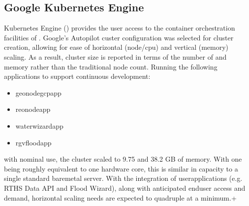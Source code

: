 \documentclass[letterpaper,12pt,english,openany,oneside]{sphinxmanual}
\begin{document}
\subsection{Google Kubernetes Engine}
\label{\detokenize{euidev/infrastructure/index:google-kubernetes-engine}}
\sphinxAtStartPar
{} Kubernetes Engine ({\hyperref[\detokenize{_static/glossary:term-GKE}]{}}) provides the user access to the container orchestration facilities of {\hyperref[\detokenize{_static/glossary:term-GCP}]{}}. Google’s Autopilot custer configuration was selected for cluster creation, allowing for ease of horizontal (node/cpu) and vertical (memory) scaling. As a result, cluster size is reported in terms of the number of {\hyperref[\detokenize{_static/glossary:term-vCPU}]{}} and memory rather than the traditional node count. Running the following applications to support continuous development:
\begin{itemize}
\item {} 
\sphinxAtStartPar
geonodegcp\sphinxhyphen{}app

\item {} 
\sphinxAtStartPar
reonode\sphinxhyphen{}app

\item {} 
\sphinxAtStartPar
waterwizard\sphinxhyphen{}app

\item {} 
\sphinxAtStartPar
rgvflood\sphinxhyphen{}app

\end{itemize}

\sphinxAtStartPar
with nominal use, the cluster scaled to 9.75 {\hyperref[\detokenize{_static/glossary:term-vCPU}]{}} and 38.2 GB of memory. With one {\hyperref[\detokenize{_static/glossary:term-vCPU}]{}} being roughly equivalent to one hardware core, this is similar in capacity to a single standard bare\sphinxhyphen{}metal server. With the integration of user\sphinxhyphen{}applications (e.g. RTHS Data API and Flood Wizard), along with anticipated end\sphinxhyphen{}user access and demand, horizontal scaling needs are expected to quadruple at a minimum.+
\end{document}
